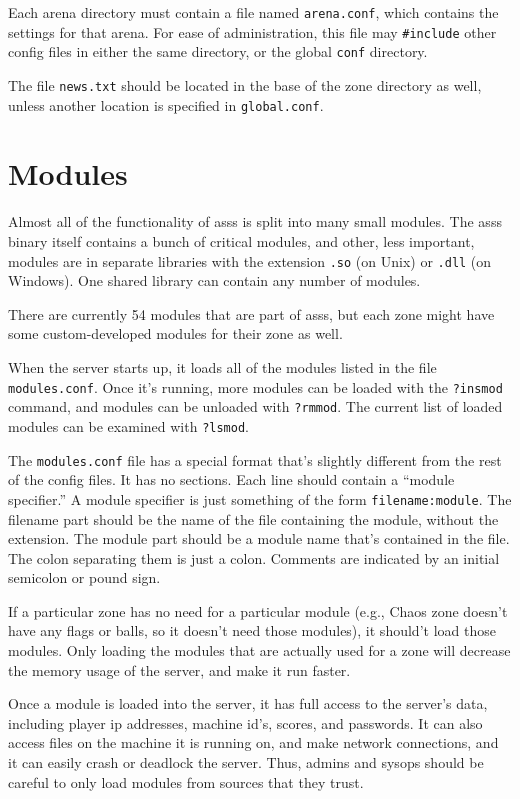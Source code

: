 \documentclass{article}
\newcommand{\asss}{asss}
\begin{document}
Each arena directory must contain a file named \verb/arena.conf/, which
contains the settings for that arena. For ease of administration, this
file may \verb/#include/ other config files in either the same
directory, or the global \verb/conf/ directory.

The file \verb/news.txt/ should be located in the base of the zone
directory as well, unless another location is specified in
\verb/global.conf/.

\section{Modules}

Almost all of the functionality of \asss{} is split into many small
modules. The \asss{} binary itself contains a bunch of critical modules,
and other, less important, modules are in separate libraries with the
extension \verb/.so/ (on Unix) or \verb/.dll/ (on Windows). One shared
library can contain any number of modules.

There are currently
54
modules that are part of \asss{}, but each zone might have some
custom-developed modules for their zone as well.

When the server starts up, it loads all of the modules listed in the
file \verb/modules.conf/. Once it's running, more modules can be loaded
with the \verb/?insmod/ command, and modules can be unloaded with
\verb/?rmmod/. The current list of loaded modules can be examined with
\verb/?lsmod/.

The \verb/modules.conf/ file has a special format that's slightly
different from the rest of the config files. It has no sections. Each
line should contain a ``module specifier.'' A module specifier is just
something of the form \verb/filename:module/. The filename part should
be the name of the file containing the module, without the extension.
The module part should be a module name that's contained in the file.
The colon separating them is just a colon. Comments are indicated by an
initial semicolon or pound sign.

If a particular zone has no need for a particular module (e.g., Chaos
zone doesn't have any flags or balls, so it doesn't need those modules),
it should't load those modules. Only loading the modules that are
actually used for a zone will decrease the memory usage of the server,
and make it run faster.

Once a module is loaded into the server, it has full access to the
server's data, including player ip addresses, machine id's, scores, and
passwords. It can also access files on the machine it is running on, and
make network connections, and it can easily crash or deadlock the
server. Thus, admins and sysops should be careful to only load modules
from sources that they trust.
\end{document}
